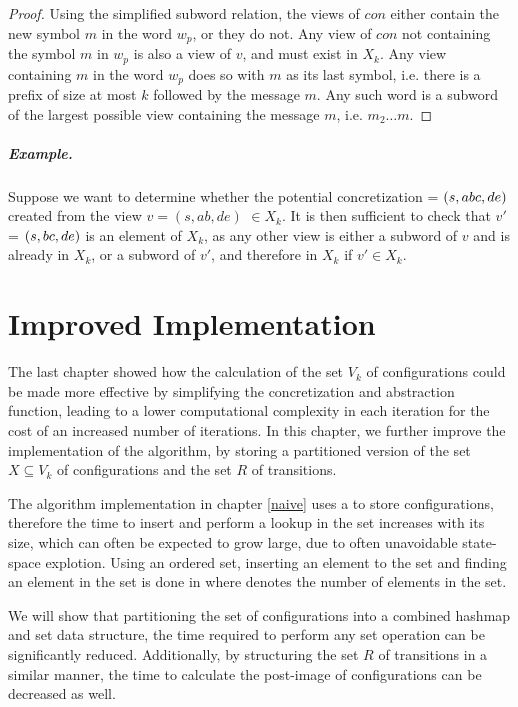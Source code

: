 \begin{proof}
Using the simplified subword relation, the views of $con$ either contain the new symbol $m$ in the word $w_p$, or they do not. Any view of $con$ not containing the symbol $m$ in $w_p$ is also a view of $v$, and must exist in $X_k$. Any view containing $m$ in the word $w_p$ does so with $m$ as its last symbol, i.e. there is a prefix of size at most $k$ followed by the message $m$. Any such word is a subword of the largest possible view containing the message $m$, i.e. $m_2\ldots m$.

\end{proof}


\subparagraph{Example.} Suppose we want to determine whether the potential concretization  = $(s, abc, de)$ created from the view $v = (s, ab, de)$ $\in X_k$. It is then sufficient to check that $v'$ = $(s,bc,de)$ is an element of $X_k$, as any other view is either a subword of $v$ and is already in $X_k$, or a subword of $v'$, and therefore in $X_k$ if $v' \in X_k$.

\newpage
\section{Improved Implementation}
The last chapter showed how the calculation of the set $V_k$ of configurations could be made more effective by simplifying the concretization and abstraction function, leading to a lower computational complexity in each iteration for the cost of an increased number of iterations. In this chapter, we further improve the implementation of the algorithm, by storing a partitioned version of the set $X \subseteq V_k$ of configurations and the set $R$ of transitions.

The algorithm implementation in chapter \ref{naive} uses a  to store configurations, therefore the time to insert and perform a lookup in the set increases with its size, which can often be expected to grow large, due to often unavoidable state-space explotion. Using an ordered set, inserting an element to the set and finding an element in the set is done in  where  denotes the number of elements in the set.

We will show that partitioning the set of configurations into a combined hashmap and set data structure, the time required to perform any set operation can be significantly reduced. Additionally, by structuring the set $R$ of transitions in a similar manner, the time to calculate the post-image of configurations can be decreased as well.

